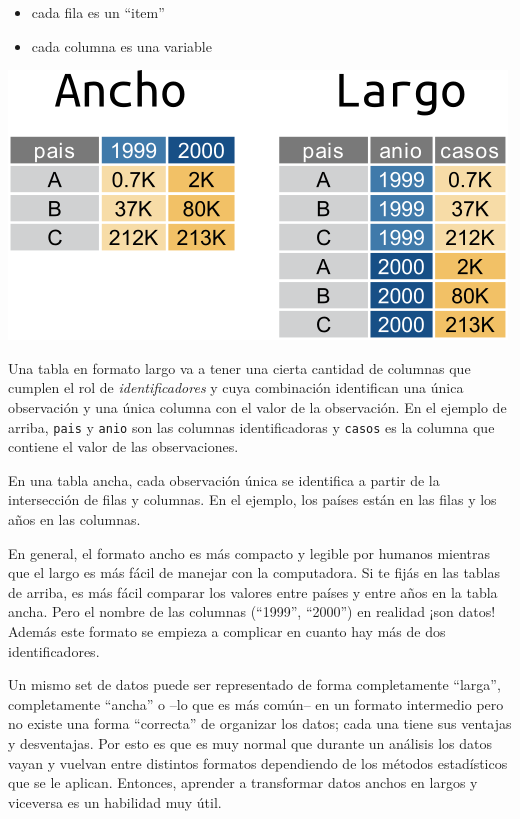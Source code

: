 \documentclass[
  openany]{book}
\providecommand{\tightlist}{%
  \setlength{\itemsep}{0pt}\setlength{\parskip}{0pt}}
\begin{document}
\begin{itemize}
\tightlist
\item
  cada fila es un ``item''
\item
  cada columna es una variable
\end{itemize}

\includegraphics{img/largo-ancho.png}

Una tabla en formato largo va a tener una cierta cantidad de columnas que cumplen el rol de \emph{identificadores} y cuya combinación identifican una única observación y una única columna con el valor de la observación.
En el ejemplo de arriba, \texttt{pais} y \texttt{anio} son las columnas identificadoras y \texttt{casos} es la columna que contiene el valor de las observaciones.

En una tabla ancha, cada observación única se identifica a partir de la intersección de filas y columnas.
En el ejemplo, los países están en las filas y los años en las columnas.

En general, el formato ancho es más compacto y legible por humanos mientras que el largo es más fácil de manejar con la computadora.
Si te fijás en las tablas de arriba, es más fácil comparar los valores entre países y entre años en la tabla ancha.
Pero el nombre de las columnas (``1999'', ``2000'') en realidad ¡son datos!
Además este formato se empieza a complicar en cuanto hay más de dos identificadores.

Un mismo set de datos puede ser representado de forma completamente ``larga'', completamente ``ancha'' o --lo que es más común-- en un formato intermedio pero no existe una forma ``correcta'' de organizar los datos; cada una tiene sus ventajas y desventajas.
Por esto es que es muy normal que durante un análisis los datos vayan y vuelvan entre distintos formatos dependiendo de los métodos estadísticos que se le aplican.
Entonces, aprender a transformar datos anchos en largos y viceversa es un habilidad muy útil.
\end{document}
